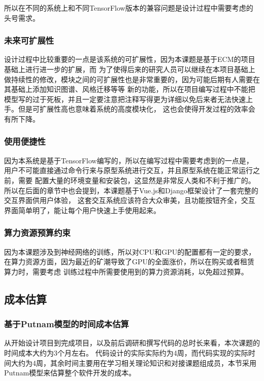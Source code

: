 \documentclass[supercite]{HustGraduPaper}
\theoremstyle{definition}
\begin{document}
所以在不同的系统上和不同TensorFlow版本的兼容问题是设计过程中需要考虑的头号需求。

\subsubsection{未来可扩展性}
设计过程中比较重要的一点是该系统的可扩展性，因为本课题是基于ECM\cite{DBLP:journals/corr/ZhouHZZL17}的项目基础上进行进一步的扩展，而
为了使得后来的研究人员可以继续在本项目基础上做持续性的修改，模块之间的可扩展性也是非常重要的，因为可能后期有人需要在其基础上添加知识图谱、风格迁移等等
新的功能，所以在项目编写过程中不能把模型写的过于死板，并且一定要注意把注释写得更为详细以免后来者无法快速上手。但是可扩展性高也意味着系统的高度模块化，
这也会使得开发过程的效率会有所下降。

\subsubsection{使用便捷性}
因为本系统是基于TensorFlow编写的，所以在编写过程中需要考虑到的一点是，用户不可能直接通过命令行来与原型系统进行交互，并且原型系统在能正常运行之前，需要
配置大量的环境变量和安装包，这显然是非常反人类和不利于推广的。所以在后面的章节中也会提到，本课题基于Vue.js和Django框架设计了一套完整的交互界面供用户体验，
这套交互系统应该符合大众审美，且功能按钮齐全，交互界面简单明了，能让每个用户快速上手使用起来。

\subsubsection{算力资源预算约束}
因为本课题涉及到神经网络的训练，所以对CPU和GPU的配置都有一定的要求，在算力资源方面，因为最近的矿潮导致了GPU的全面涨价，所以在购买或者租赁算力时，需要考虑
训练过程中所需要使用到的算力资源消耗，以免超过预算。

\subsection{成本估算}

\subsubsection{基于Putnam模型的时间成本估算}
从开始设计项目到完成项目，以及前后调研和撰写代码的总时长来看，本次课题的时间成本大约为3个月左右。
代码设计的实际实际约为4周，而代码实现的实际时间大约为4周，其余时间主要用在学习相关理论知识和对接课题组成员，本节采用
Putnam模型\cite{王红珍2012软件开发成本估算模型的研究}来估算整个软件开发的成本。
\end{document}
